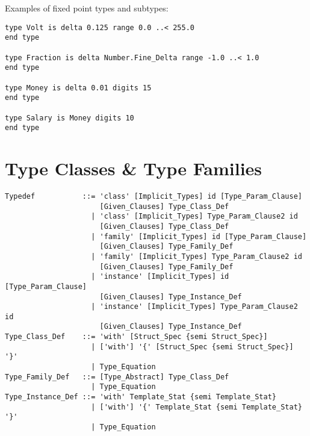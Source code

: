 \example Examples of fixed point types and subtypes:
\begin{lstlisting}
type Volt is delta 0.125 range 0.0 ..< 255.0 
end type

type Fraction is delta Number.Fine_Delta range -1.0 ..< 1.0 
end type

type Money is delta 0.01 digits 15 
end type

type Salary is Money digits 10 
end type
\end{lstlisting}





\section{Type Classes \& Type Families}
\label{sec:type-classes}

\syntax\begin{lstlisting}
Typedef           ::= 'class' [Implicit_Types] id [Type_Param_Clause] 
                      [Given_Clauses] Type_Class_Def
                    | 'class' [Implicit_Types] Type_Param_Clause2 id 
                      [Given_Clauses] Type_Class_Def
                    | 'family' [Implicit_Types] id [Type_Param_Clause] 
                      [Given_Clauses] Type_Family_Def
                    | 'family' [Implicit_Types] Type_Param_Clause2 id 
                      [Given_Clauses] Type_Family_Def
                    | 'instance' [Implicit_Types] id [Type_Param_Clause] 
                      [Given_Clauses] Type_Instance_Def 
                    | 'instance' [Implicit_Types] Type_Param_Clause2 id 
                      [Given_Clauses] Type_Instance_Def
Type_Class_Def    ::= 'with' [Struct_Spec {semi Struct_Spec}]
                    | ['with'] '{' [Struct_Spec {semi Struct_Spec}] '}'
                    | Type_Equation
Type_Family_Def   ::= [Type_Abstract] Type_Class_Def
                    | Type_Equation
Type_Instance_Def ::= 'with' Template_Stat {semi Template_Stat}
                    | ['with'] '{' Template_Stat {semi Template_Stat} '}'
                    | Type_Equation
\end{lstlisting}




























